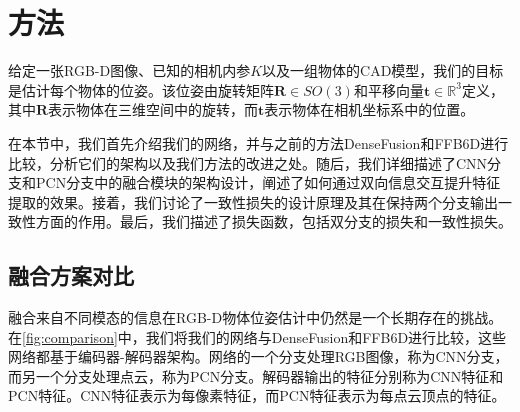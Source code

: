 \section{方法}

给定一张RGB-D图像、已知的相机内参$K$以及一组物体的CAD模型，我们的目标是估计每个物体的位姿。该位姿由旋转矩阵$\mathbf{R} \in SO(3)$和平移向量$\mathbf{t} \in \mathbb{R}^3$定义，其中$\mathbf{R}$表示物体在三维空间中的旋转，而$\mathbf{t}$表示物体在相机坐标系中的位置。

在本节中，我们首先介绍我们的网络，并与之前的方法DenseFusion\cite{wang2019densefusion}和FFB6D\cite{he2021ffb6d}进行比较，分析它们的架构以及我们方法的改进之处。随后，我们详细描述了CNN分支和PCN分支中的融合模块的架构设计，阐述了如何通过双向信息交互提升特征提取的效果。接着，我们讨论了一致性损失的设计原理及其在保持两个分支输出一致性方面的作用。最后，我们描述了损失函数，包括双分支的损失和一致性损失。

\subsection{融合方案对比}

融合来自不同模态的信息在RGB-D物体位姿估计中仍然是一个长期存在的挑战。在\autoref{fig:comparison}中，我们将我们的网络与DenseFusion\cite{wang2019densefusion}和FFB6D\cite{he2021ffb6d}进行比较，这些网络都基于编码器-解码器架构。网络的一个分支处理RGB图像，称为CNN分支，而另一个分支处理点云，称为PCN分支。解码器输出的特征分别称为CNN特征和PCN特征。CNN特征表示为每像素特征，而PCN特征表示为每点云顶点的特征。


